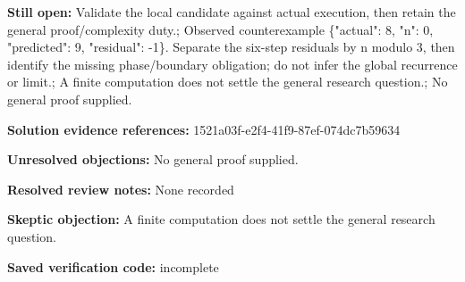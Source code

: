 \documentclass[11pt]{article}
\begin{document}
\textbf{Still open:} Validate the local candidate against actual execution, then retain the general proof/complexity duty.; Observed counterexample \{"actual": 8, "n": 0, "predicted": 9, "residual": -1\}. Separate the six-step residuals by n modulo 3, then identify the missing phase/boundary obligation; do not infer the global recurrence or limit.; A finite computation does not settle the general research question.; No general proof supplied.\par
\textbf{Solution evidence references:} 1521a03f-e2f4-41f9-87ef-074dc7b59634\par
\textbf{Unresolved objections:} No general proof supplied.\par
\textbf{Resolved review notes:} None recorded\par
\textbf{Skeptic objection:} A finite computation does not settle the general research question.\par
\textbf{Saved verification code:} incomplete\par
\end{document}
